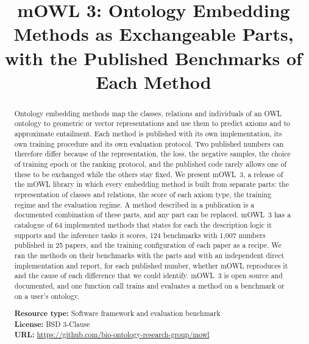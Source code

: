 \documentclass[runningheads]{llncs}
\begin{document}
\title{mOWL 3: Ontology Embedding Methods as Exchangeable Parts, with the Published
Benchmarks of Each Method}

\author{}
\authorrunning{}
\institute{}

\maketitle

\begin{abstract}
Ontology embedding methods map the classes, relations and individuals of an OWL ontology
to geometric or vector representations and use them to predict axioms and to approximate
entailment. Each method is published with its own implementation, its own training
procedure and its own evaluation protocol. Two published numbers can therefore differ
because of the representation, the loss, the negative samples, the choice of training
epoch or the ranking protocol, and the published code rarely allows one of these to be
exchanged while the others stay fixed. We present mOWL~3, a release of the mOWL library in
which every embedding method is built from separate parts: the representation of classes
and relations, the score of each axiom type, the training regime and the evaluation
regime. A method described in a publication is a documented combination of these parts,
and any part can be replaced. mOWL~3 has a catalogue of 64 implemented methods that states
for each the description logic it supports and the inference tasks it scores, 124
benchmarks with 1,007 numbers published in 25 papers, and the training configuration of
each paper as a recipe. We ran the methods on their benchmarks with the parts and with an
independent direct implementation and report, for each published number, whether mOWL
reproduces it and the cause of each difference that we could identify. mOWL~3 is open
source and documented, and one function call trains and evaluates a method on a benchmark
or on a user's ontology.

\medskip\noindent
\textbf{Resource type:} Software framework and evaluation benchmark\\
\textbf{License:} BSD 3-Clause\\

\textbf{URL:} \url{https://github.com/bio-ontology-research-group/mowl}

\end{abstract}
\end{document}

